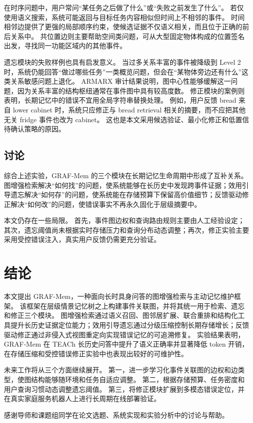 \documentclass{cjc}
\begin{document}
在时序问题中，用户常问“某任务之后做了什么”或“失败之前发生了什么”。
若仅使用语义搜索，系统可能返回与目标任务内容相似但时间上不相邻的事件。
时间相邻边提供了更强的局部顺序约束，使候选证据不仅语义相关，而且位于正确的前后关系中。
共位置边则主要帮助空间类问题，可从大型固定物体构成的位置签名出发，寻找同一功能区域内的其他事件。

遗忘模块的失败样例也具有启发意义。
当过多关系丰富的事件被降级到 Level 2 时，系统仍能回答“做过哪些任务”一类概览问题，但会在“某物体旁边还有什么”这类关系敏感问题上退化。
ARMARX 审计结果说明，图中心性能够缓解这一问题，因为关系丰富的结构枢纽通常在事件图中具有较高度数。
修正模块的案例则表明，长期记忆中的错误不宜用全局字符串替换处理。
例如，用户反馈 bread 来自 lower cabinet 时，系统只应修正与 bread retrieval 相关的摘要，而不应把其他无关 fridge 事件也改为 cabinet。
这也是本文采用候选验证、最小化修正和低置信待确认策略的原因。

\subsection{讨论}

综合上述实验，GRAF-Mem 的三个模块在长期记忆生命周期中形成了互补关系。
图增强检索解决“如何找”的问题，使系统能够在长历史中发现跨事件证据；效用引导遗忘解决“如何存”的问题，使系统能在存储预算下保留高价值细节；反馈驱动修正解决“如何改”的问题，使错误事实不再永久固化于层级摘要中。

本文仍存在一些局限。
首先，事件图边权和查询路由规则主要由人工经验设定；其次，遗忘阈值尚未根据实时存储压力和查询分布动态调整；再次，修正实验主要采用受控错误注入，真实用户反馈仍需更充分验证。

\section{结论}

本文提出 GRAF-Mem，一种面向长时具身问答的图增强检索与主动记忆维护框架。
该框架在层级情景记忆树之上构建事件关联图，并将其统一用于检索、遗忘和修正三个模块。
图增强检索通过语义召回、图邻居扩展、联合重排和结构化工具提升长历史证据定位能力；效用引导遗忘通过分级压缩控制长期存储增长；反馈驱动修正通过非侵入式视图重定向实现错误记忆的可追溯修复。
实验结果表明，GRAF-Mem 在 TEACh 长历史问答中提升了语义正确率并显著降低 token 开销，在存储压缩和受控错误修正实验中也表现出较好的可维护性。

未来工作将从三个方面继续展开。
第一，进一步学习化事件关联图的边权和边类型，使图结构能够随环境和任务自适应调整。
第二，根据存储预算、任务密度和用户查询习惯动态调整遗忘阈值。
第三，将修正模块扩展到多模态错误定位，并在真实家庭服务机器人上进行长周期在线部署验证。

\begin{acknowledgments}
感谢导师和课题组同学在论文选题、系统实现和实验分析中的讨论与帮助。
\end{acknowledgments}



\end{document}
